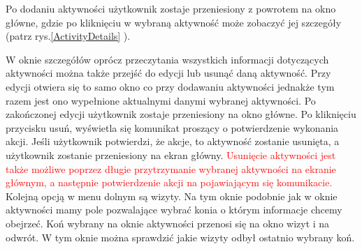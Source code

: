 \documentclass[12pt,twoside]{report}
\begin{document}
Po dodaniu aktywności użytkownik zostaje przeniesiony z powrotem na okno główne, gdzie po kliknięciu w wybraną aktywność może zobaczyć jej szczegóły (patrz rys.\ref{ActivityDetails} ). 

W oknie szczegółów oprócz przeczytania wszystkich informacji dotyczących aktywności można także przejść do edycji lub usunąć daną aktywność. Przy edycji otwiera się to samo okno co przy dodawaniu aktywności jednakże tym razem jest ono wypełnione aktualnymi danymi wybranej aktywności. Po zakończonej edycji użytkownik zostaje przeniesiony na okno główne. Po kliknięciu przycisku usuń, wyświetla się komunikat proszący o potwierdzenie wykonania akcji. Jeśli użytkownik potwierdzi, że akcje, to aktywność zostanie usunięta, a użytkownik zostanie przeniesiony na ekran główny. \textcolor{red}{Usunięcie aktywności jest także możliwe poprzez długie przytrzymanie wybranej aktywności na ekranie głównym, a następnie potwierdzenie akcji na pojawiającym się komunikacie.}
\newpage
Kolejną opcją w menu dolnym są wizyty. Na tym oknie podobnie jak w oknie aktywności mamy pole pozwalające wybrać konia o którym informacje chcemy obejrzeć. Koń wybrany na oknie aktywności przenosi się na okno wizyt i na odwrót. W tym oknie można sprawdzić jakie wizyty odbył ostatnio wybrany koń. 
\end{document}
